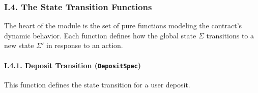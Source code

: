 \documentclass[
  english,
  onecolumn]{article}
\begin{document}
\subsubsection{I.4. The State Transition
Functions}\label{i.4.-the-state-transition-functions}

The heart of the module is the set of pure functions modeling the
contract's dynamic behavior. Each function defines how the global state
\(\Sigma\) transitions to a new state \(\Sigma'\) in response to an
action.

\paragraph{\texorpdfstring{I.4.1. Deposit Transition
(\texttt{DepositSpec})}{I.4.1. Deposit Transition (DepositSpec)}}\label{i.4.1.-deposit-transition-depositspec}

This function defines the state transition for a user deposit.
\end{document}
